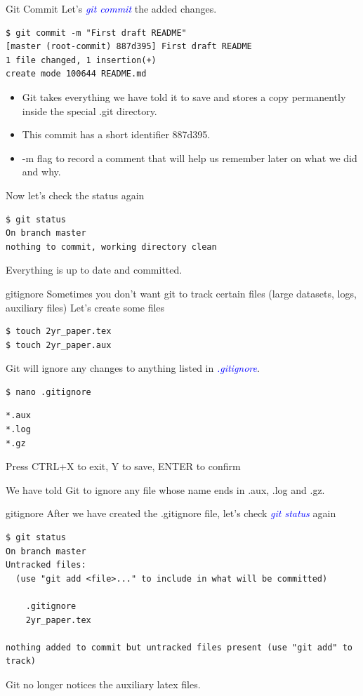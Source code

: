 \documentclass[11pt]{beamer}
\begin{document}
\begin{frame}[fragile]{Git Commit}
Let's \textcolor{blue}{\emph{git commit}} the added changes. 
\begin{lstlisting}
$ git commit -m "First draft README"
[master (root-commit) 887d395] First draft README
1 file changed, 1 insertion(+)
create mode 100644 README.md
\end{lstlisting}
\begin{itemize}
\item
Git takes everything we have told it to save and stores a copy permanently inside the special .git directory.
\item
This commit has a short identifier 887d395.
\item
 -m flag to record a comment that will help us remember later on what we did and why.
\end{itemize}
Now let's check the status again
\begin{lstlisting}
$ git status
On branch master
nothing to commit, working directory clean
\end{lstlisting}
Everything is up to date and committed.
\end{frame}


\begin{frame}[fragile]{gitignore}
Sometimes you don't want git to track certain files (large datasets, logs, auxiliary files)
Let's create some files
\begin{lstlisting}
$ touch 2yr_paper.tex
$ touch 2yr_paper.aux
\end{lstlisting}

Git will ignore any changes to anything listed in \textcolor{blue}{\emph{.gitignore}}.
\begin{lstlisting}
$ nano .gitignore
\end{lstlisting}
\begin{lstlisting}
*.aux
*.log
*.gz
\end{lstlisting}
\tiny Press CTRL+X to exit, Y to save, ENTER to confirm

\normalsize 
We have told Git to ignore any file whose name ends in .aux, .log and .gz. 
\end{frame}

\begin{frame}[fragile]{gitignore}
After we have created the .gitignore file, let's check \textcolor{blue}{\emph{git status}} again
\begin{lstlisting}
$ git status
On branch master
Untracked files:
  (use "git add <file>..." to include in what will be committed)

	.gitignore
	2yr_paper.tex

nothing added to commit but untracked files present (use "git add" to track)
\end{lstlisting}
Git no longer notices the auxiliary latex files.

\end{frame}
\end{document}
